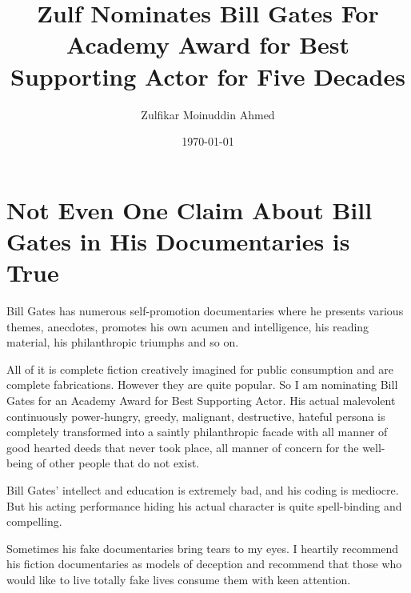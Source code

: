 \documentclass{amsart}
\title{Zulf Nominates Bill Gates For Academy Award for Best Supporting Actor for Five Decades}
\author{Zulfikar Moinuddin Ahmed}
\date{\today}
\begin{document}
\maketitle

\section{Not Even One Claim About Bill Gates in His Documentaries is True}

Bill Gates has numerous self-promotion documentaries where he presents various themes, anecdotes, promotes his own acumen and intelligence, his reading material, his philanthropic triumphs and so on.  

All of it is complete fiction creatively imagined for public consumption and are complete fabrications.  However they are quite popular.  So I am nominating Bill Gates for an Academy Award for Best Supporting Actor.  His actual malevolent continuously power-hungry, greedy, malignant, destructive, hateful persona is completely transformed into a saintly philanthropic facade with all manner of good hearted deeds that never took place, all manner of concern for the well-being of other people that do not exist.

Bill Gates' intellect 
and education is extremely bad, and his coding is mediocre.  But his acting performance hiding his actual character is quite spell-binding and compelling.  

Sometimes his fake documentaries bring tears to my eyes.  I heartily recommend his fiction documentaries as models of deception and recommend that those who would like to live totally fake lives consume them with keen attention.
\end{document}
